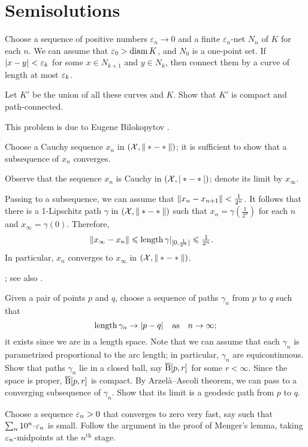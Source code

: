 \chapter{Semisolutions}

Choose a sequence of positive numbers $\varepsilon_n\to 0$ and a finite $\varepsilon_n$-net $N_n$ of $K$ for each $n$.
We can assume that $\varepsilon_0>\operatorname{\rm diam}\nolimits K$, and $N_0$ is a one-point set.
If $\dist{x}{y}{}<\eps_k$ for some $x\in N_{k+1}$ and $y\in N_{k}$, then connect them by a curve of length at most $\varepsilon_k$.

Let $K'$ be the union of all these curves and $K$.
Show that $K'$ is compact and path-connected.

 This problem is due to Eugene Bilokopytov \cite{bilokopytov}.

Choose a Cauchy sequence $x_n$ in $(\spc{X},\|*\z-*\|)$; it is sufficient to show that a subsequence of $x_n$ converges.

Observe that the sequence $x_n$ is Cauchy in $(\mathcal{X},|*-*|)$;
denote its limit by $x_\infty$.

Passing to a subsequence, we can assume that $\|x_n-x_{n+1}\|\z<\tfrac1{2^n}$.
It follows that there is a 1-Lipschitz path $\gamma$ in $(\mathcal{X},\|*-*\|)$ such that $x_n=\gamma(\tfrac1{2^n})$ for each $n$ and $x_\infty=\gamma(0)$.
Therefore,
\begin{align*}
\|x_\infty-x_n\|&\leqslant \mathop{\rm length}\nolimits\gamma|_{[0,\frac1{2^n}]}\leqslant \tfrac1{2^n}.
\end{align*}
In particular, $x_n$ converges to $x_\infty$ in $(\spc{X},\|*\z-*\|)$.

 \cite[Corollary]{hu-kirk}; see also \cite[Lemma 2.3]{petrunin-stadler}.

Given a pair of points $p$ and $q$, choose a sequence of paths $\gamma_n$ from $p$ to $q$ such that
\[\length\gamma_n\to \dist pq{}
\quad\text{as}\quad
n\to\infty;\]
it exists since we are in a length space.
Note that we can assume that each $\gamma_n$ is parametrized proportional to the arc length;
in particular, $\gamma_n$ are equicontinuous.
Show that paths $\gamma_n$ lie in a closed ball, say $\overline{\mathrm{B}}{}[p,r]$ for some $r<\infty$.
Since the space is proper, $\overline{\mathrm{B}}{}[p,r]$ is compact.
By Arzelà--Ascoli theorem, we can pass to a converging subsequence of $\gamma_n$.
Show that its limit is a geodesic path from $p$ to $q$.

Choose a sequence $\varepsilon_n>0$ that converges to zero very fast, say such that $\sum_n10^n\cdot \eps_n$ is small.
Follow the argument in the proof of Menger's lemma, taking $\varepsilon_n$-midpoints at the $n^{\text{th}}$ stage.

